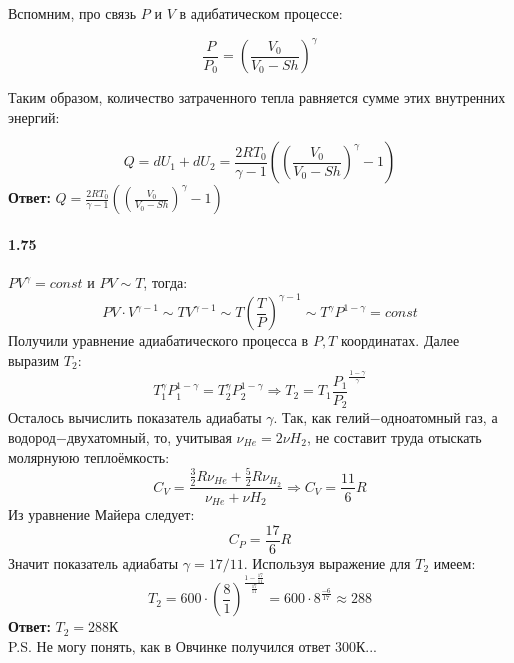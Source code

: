 \documentclass{article}
\begin{document}
Вспомним, про связь $P$ и $V$ в адибатическом процессе:

\begin{displaymath}
\frac {P}{P_{0}}=(\frac{V_{0}}{V_{0}-Sh})^{\gamma}
\end{displaymath}

Таким образом, количество затраченного тепла равняется сумме этих внутренних энергий:

\begin{displaymath}
Q=dU_{1}+dU_{2}=\frac{2RT_{0}}{\gamma-1}((\frac{V_{0}}{V_{0}-Sh})^{\gamma}-1)
\end{displaymath}
\textbf{Ответ:} $Q=\frac{2RT_{0}}{\gamma-1}((\frac{V_{0}}{V_{0}-Sh})^{\gamma}-1)$


\paragraph{1.75}
\par $PV^\gamma=const$ и $PV\sim T$, тогда:
\begin{displaymath}
PV\cdot V^{\gamma-1}\sim TV^{\gamma-1}\sim T(\frac TP)^{\gamma-1}\sim T^\gamma P^{1-\gamma}=const
\end{displaymath}
Получили уравнение адиабатического процесса в $P, T$ координатах. Далее выразим $T_{2}$:
\begin{displaymath}
T_{1}^{\gamma}P_{1}^{1-\gamma}=T_{2}^{\gamma}P_{2}^{1-\gamma}\Rightarrow T_{2}=T_{1}\frac{P_{1}}{P_{2}}^{\frac{1-\gamma}{\gamma}}
\end{displaymath}
Осталось вычислить показатель адиабаты $\gamma$. Так, как гелий$-$одноатомный газ, а водород$-$двухатомный, то, учитывая $\nu_{He}=2\nu{H_{2}}$, не составит труда отыскать молярнуюю теплоёмкость:
\begin{displaymath}
C_{V}=\frac{\frac32R\nu_{He} + \frac52R\nu_{H_{2}}}{\nu_{He}+\nu{H_{2}}}\Rightarrow C_{V}=\frac{11}{6}R
\end{displaymath}
Из уравнение Майера следует: \begin{displaymath}C_{P}=\frac{17}{6}R\end{displaymath}Значит показатель адиабаты $\gamma=17/11$. Используя выражение для $T_{2}$ имеем:
\begin{displaymath}
T_{2}=600\cdot(\frac81)^{\frac{1-\frac{17}{11}}{\frac{17}{11}}}=600\cdot8^{\frac{-6}{17}}\approx288
\end{displaymath}
\textbf{Ответ:} $T_{2}=288$К\\
P.S. Не могу понять, как в Овчинке получился ответ 300К... 
\end{document}
